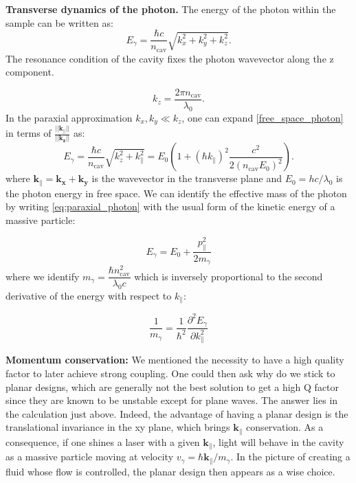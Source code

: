 \bigskip\noindent
\textbf{Transverse dynamics of the photon.} The energy of the photon within the sample can be written as:
\begin{equation}
    E_\gamma = \dfrac{\hbar c}{n_{\mathrm{cav}}} \sqrt{k_x^2 + k_y^2 + k_z^2}.
\label{free_space_photon}
\end{equation}
The resonance condition of the cavity fixes the photon wavevector along the z component. 

\begin{equation}
    k_z = \dfrac{2\pi n_{\mathrm{cav}}}{\lambda_0}.
    \label{eq:kz}
\end{equation}
In the paraxial approximation $k_x,k_y \ll k_z$, one can expand \eqref{free_space_photon} in terms of $\frac{||\bm{k_{\parallel}}||}{||\bm{k_z}||}$ as:
\begin{equation}
    E_\gamma = \dfrac{\hbar c}{n_{\mathrm{cav}}} \sqrt{k_z^2 + k_{\parallel}^2} = E_0 \left( 1 + (\hbar k_{\parallel })^2 \dfrac{c ^2}{2(n_{\mathrm{cav}} E_0)^2} \right).
    \label{eq:paraxial_photon}
\end{equation}
where $\bm{k_{\parallel}}=\bm{k_x}+\bm{k_y}$ is the wavevector in the transverse plane and $E_0=hc/\lambda_0$ is the photon energy in free space. We can identify the effective mass of the photon by writing \eqref{eq:paraxial_photon} with the usual form of the kinetic energy of a massive particle:

\begin{equation}
    E_\gamma = E_0 + \dfrac{p_{\parallel}^2}{2m_{\gamma}}  
    \label{eq:photon_mass}
\end{equation}
where we identify $m_{\gamma} = \dfrac{\hbar n_{\mathrm{cav}}^2}{\lambda_0 c}$ which is inversely proportional to the second derivative of the energy with respect to $k_{\parallel}$:

\begin{equation}
    \dfrac{1}{m_{\gamma}} = \dfrac{1}{\hbar^2}\dfrac{\partial^2 E_{\gamma}}{\partial k_{\parallel}^2}
    \label{eq:mass}
\end{equation}

\noindent\textbf{Momentum conservation:}
We mentioned the necessity to have a high quality factor to later achieve strong coupling. One could then ask why do we stick to planar designs, which are generally not the best solution to get a high Q factor since they are known to be unstable except for plane waves. The answer lies in the calculation just above. Indeed, the advantage of having a planar design is the translational invariance in the xy plane, which brings $\bm{k_{\parallel}}$ conservation. As a consequence, if one shines a laser with a given $\bm{k_{\parallel}}$, light will behave in the cavity as a massive particle moving at velocity $v_\gamma=\hbar \bm{k_{\parallel}}/m_\gamma$. In the picture of creating a fluid whose flow is controlled, the planar design then appears as a wise choice.


